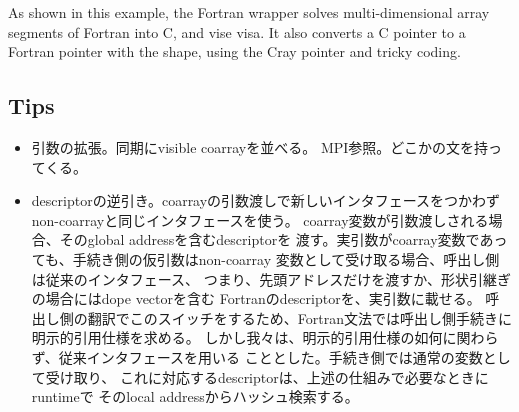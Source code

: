 As shown in this example, the Fortran wrapper solves
multi-dimensional array segments of Fortran into C, and vise visa.
It also converts a C pointer to a Fortran pointer with the shape, using
the Cray pointer and tricky coding.




\subsection{Tips}


\begin{itemize}
\item
引数の拡張。同期にvisible coarrayを並べる。
MPI参照。どこかの文を持ってくる。

\item
descriptorの逆引き。coarrayの引数渡しで新しいインタフェースをつかわず
non-coarrayと同じインタフェースを使う。
%
coarray変数が引数渡しされる場合、そのglobal addressを含むdescriptorを
渡す。実引数がcoarray変数であっても、手続き側の仮引数はnon-coarray
変数として受け取る場合、呼出し側は従来のインタフェース、
つまり、先頭アドレスだけを渡すか、形状引継ぎの場合にはdope vectorを含む
Fortranのdescriptorを、実引数に載せる。
呼出し側の翻訳でこのスイッチをするため、Fortran文法では呼出し側手続きに
明示的引用仕様を求める。
%
しかし我々は、明示的引用仕様の如何に関わらず、従来インタフェースを用いる
こととした。手続き側では通常の変数として受け取り、
これに対応するdescriptorは、上述の仕組みで必要なときにruntimeで
そのlocal addressからハッシュ検索する。

\end{itemize}

